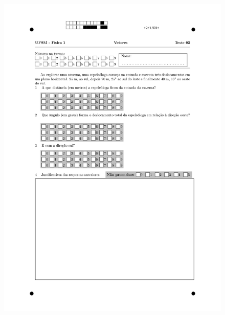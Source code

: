 \begin{figure}[H]\centering
\includegraphics[scale=0.7]{fig/orp1q2_page-0002.jpg}
\end{figure}
\vspace*{\fill}
